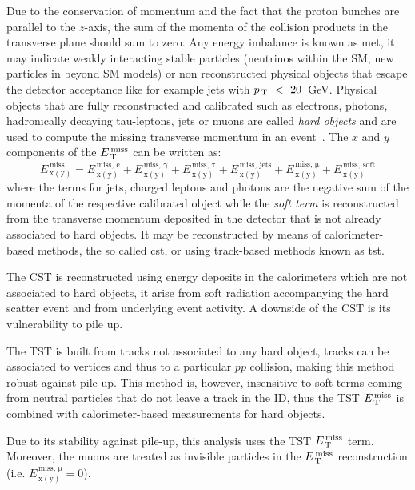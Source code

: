 Due to the conservation of momentum and the fact that the proton bunches are
parallel to the $z$-axis, the sum of the momenta of the collision products in
the transverse plane should sum to zero. Any energy imbalance is known as
\gls{met}, it may indicate weakly interacting stable particles (neutrinos within
the SM, new particles in beyond SM models) or non reconstructed physical objects
that escape the detector acceptance like for example jets with $p_\mathrm{\, T}~<~20$~GeV\@.
Physical objects that are fully reconstructed and calibrated such as electrons,
photons, hadronically decaying tau-leptons, jets or muons are called \emph{hard
  objects} and are used to compute the missing transverse momentum in an
event~\cite{MET}. The $x$ and $y$ components of the $E_\mathrm{\, T}^\mathrm{\, miss}$ can be written as:
\begin{equation}
  \label{eq:62}
  E_\mathrm{\, x(y)}^\mathrm{\, miss} = E_\mathrm{\, x(y)}^\mathrm{\, miss,\, e} +
  E_\mathrm{\, x(y)}^\mathrm{\, miss,\, \gamma} + E_\mathrm{\, x(y)}^\mathrm{\,
    miss,\, \tau} + E_\mathrm{\, x(y)}^\mathrm{\, miss,\, \text{jets}} +
  E_\mathrm{\, x(y)}^\mathrm{\, miss,\, \mu} + E_\mathrm{\, x(y)}^\mathrm{\, miss,\,
    \text{soft}}
\end{equation}
where the terms for jets, charged leptons and photons are the negative sum of
the momenta of the respective calibrated object while the \emph{soft term} is
reconstructed from the transverse momentum deposited in the detector that is not
already associated to hard objects. It may be reconstructed by means of
calorimeter-based methods, the so called \gls{cst}, or using track-based methods
known as \gls{tst}.

The CST is reconstructed using energy deposits in the calorimeters which are not
associated to hard objects, it arise from soft radiation accompanying the hard
scatter event and from underlying event activity. A downside of the CST is its
vulnerability to pile up.

The TST is built from tracks not associated to any hard object, tracks can be
associated to vertices and thus to a particular $pp$ collision, making this
method robust against pile-up. This method is, however, insensitive to soft
terms coming from neutral particles that do not leave a track in the ID, thus
the TST $E_\mathrm{\, T}^\mathrm{\, miss}$ is combined with calorimeter-based measurements for hard objects.

Due to its stability against pile-up, this analysis uses the TST $E_\mathrm{\, T}^\mathrm{\, miss}$ term.
Moreover, the muons are treated as invisible particles in the $E_\mathrm{\, T}^\mathrm{\, miss}$
reconstruction (i.e. $E_\mathrm{\, x(y)}^\mathrm{\, miss,\, \mu} = 0$).
